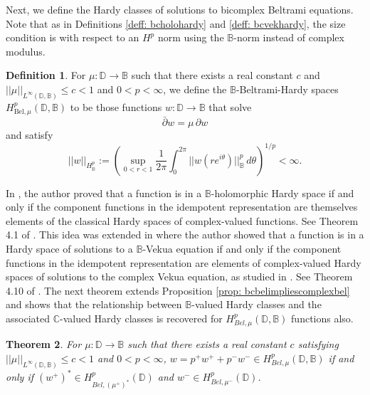 \documentclass[12pt,reqno]{amsart}
\newtheorem{theorem}{Theorem}[section]
\theoremstyle{definition}
\newtheorem{deff}[theorem]{Definition}
\theoremstyle{remark}
\newcommand{\p}{\partial}
\newcommand{\dbar}{\bar\partial}
\newcommand{\bc}{\mathbb{B}}
\newcommand{\disk}{\mathbb{D}}
\begin{document}
Next, we define the Hardy classes of solutions to bicomplex Beltrami equations. Note that as in Definitions \ref{deff: bcholohardy} and 
\ref{deff: bcvekhardy}, the size condition is with respect to an $H^p$ norm using the $\bc$-norm instead of complex modulus. 

\begin{deff}
For $\mu : \disk \to \bc$ such that there exists a real constant $c$ and $||\mu||_{L^\infty(\disk,\bc)} \leq c < 1$ and $0 < p < \infty$, we define the $\bc$-Beltrami-Hardy spaces $H^p_{\text{Bel},\mu}(\disk,\bc)$ to be those functions $w: \disk\to\bc$ that solve
    \[
        \dbar w = \mu \, \p w
    \]
and satisfy
    \[
        ||w||_{H^p_{\bc}} := \left( \sup_{0< r < 1} \frac{1}{2\pi}\int_0^{2\pi} ||w(re^{i\theta})||_{\bc}^p\,d\theta\right)^{1/p} < \infty.
    \]
\end{deff}

In \cite{BCAtomic}, the author proved that a function is in a $\bc$-holomorphic Hardy space if and only if the component functions in the idempotent representation are themselves elements of the classical Hardy spaces of complex-valued functions. See Theorem 4.1 of \cite{BCAtomic}. This idea was extended in \cite{BCHoiv} where the author showed that a function is in a Hardy space of solutions to a $\bc$-Vekua equation if and only if the component functions in the idempotent representation are elements of complex-valued Hardy spaces of solutions to the complex Vekua equation, as studied in \cite{KlimBook, PozHardy, CompOp, moreVekHardy, conjbel}. See Theorem 4.10 of \cite{BCHoiv}. The next theorem extends Proposition \ref{prop: bcbelimpliescomplexbel} and shows that the relationship between $\bc$-valued Hardy classes and the associated $\mathbb{C}$-valued Hardy classes is recovered for $H^p_{Bel,\mu}(\disk,\bc)$ functions also. 

\begin{theorem}\label{thm: bcbelhardyrep}
    For $\mu : \disk \to \bc$ such that there exists a real constant $c$ satisfying $||\mu||_{L^\infty(\disk,\bc)} \leq c < 1$ and $0 < p < \infty$, $w = p^+ w^+ + p^- w^- \in H^p_{Bel,\mu}(\disk,\bc)$ if and only if $(w^+)^* \in H^p_{Bel, (\mu^+)^*}(\disk)$ and $w^- \in H^p_{Bel,\mu^-}(\disk)$. 
\end{theorem}
\end{document}
